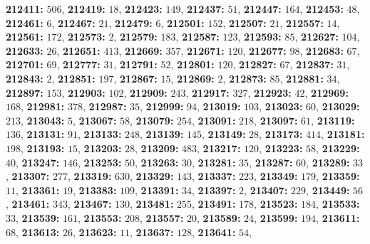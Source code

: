 \textsf{\bfseries 212411:} $506$, \textsf{\bfseries 212419:} $18$, \textsf{\bfseries 212423:} $149$, \textsf{\bfseries 212437:} $51$, \textsf{\bfseries 212447:} $164$, \textsf{\bfseries 212453:} $48$, \textsf{\bfseries 212461:} $6$, \textsf{\bfseries 212467:} $21$, \textsf{\bfseries 212479:} $6$, \textsf{\bfseries 212501:} $152$, \textsf{\bfseries 212507:} $21$, \textsf{\bfseries 212557:} $14$, \textsf{\bfseries 212561:} $172$, \textsf{\bfseries 212573:} $2$, \textsf{\bfseries 212579:} $183$, \textsf{\bfseries 212587:} $123$, \textsf{\bfseries 212593:} $85$, \textsf{\bfseries 212627:} $104$, \textsf{\bfseries 212633:} $26$, \textsf{\bfseries 212651:} $413$, \textsf{\bfseries 212669:} $357$, \textsf{\bfseries 212671:} $120$, \textsf{\bfseries 212677:} $98$, \textsf{\bfseries 212683:} $67$, \textsf{\bfseries 212701:} $69$, \textsf{\bfseries 212777:} $31$, \textsf{\bfseries 212791:} $52$, \textsf{\bfseries 212801:} $120$, \textsf{\bfseries 212827:} $67$, \textsf{\bfseries 212837:} $31$, \textsf{\bfseries 212843:} $2$, \textsf{\bfseries 212851:} $197$, \textsf{\bfseries 212867:} $15$, \textsf{\bfseries 212869:} $2$, \textsf{\bfseries 212873:} $85$, \textsf{\bfseries 212881:} $34$, \textsf{\bfseries 212897:} $153$, \textsf{\bfseries 212903:} $102$, \textsf{\bfseries 212909:} $243$, \textsf{\bfseries 212917:} $327$, \textsf{\bfseries 212923:} $42$, \textsf{\bfseries 212969:} $168$, \textsf{\bfseries 212981:} $378$, \textsf{\bfseries 212987:} $35$, \textsf{\bfseries 212999:} $94$, \textsf{\bfseries 213019:} $103$, \textsf{\bfseries 213023:} $60$, \textsf{\bfseries 213029:} $213$, \textsf{\bfseries 213043:} $5$, \textsf{\bfseries 213067:} $58$, \textsf{\bfseries 213079:} $254$, \textsf{\bfseries 213091:} $218$, \textsf{\bfseries 213097:} $61$, \textsf{\bfseries 213119:} $136$, \textsf{\bfseries 213131:} $91$, \textsf{\bfseries 213133:} $248$, \textsf{\bfseries 213139:} $145$, \textsf{\bfseries 213149:} $28$, \textsf{\bfseries 213173:} $414$, \textsf{\bfseries 213181:} $198$, \textsf{\bfseries 213193:} $15$, \textsf{\bfseries 213203:} $28$, \textsf{\bfseries 213209:} $483$, \textsf{\bfseries 213217:} $120$, \textsf{\bfseries 213223:} $58$, \textsf{\bfseries 213229:} $40$, \textsf{\bfseries 213247:} $146$, \textsf{\bfseries 213253:} $50$, \textsf{\bfseries 213263:} $30$, \textsf{\bfseries 213281:} $35$, \textsf{\bfseries 213287:} $60$, \textsf{\bfseries 213289:} $33$, \textsf{\bfseries 213307:} $277$, \textsf{\bfseries 213319:} $630$, \textsf{\bfseries 213329:} $143$, \textsf{\bfseries 213337:} $223$, \textsf{\bfseries 213349:} $179$, \textsf{\bfseries 213359:} $11$, \textsf{\bfseries 213361:} $19$, \textsf{\bfseries 213383:} $109$, \textsf{\bfseries 213391:} $34$, \textsf{\bfseries 213397:} $2$, \textsf{\bfseries 213407:} $229$, \textsf{\bfseries 213449:} $56$, \textsf{\bfseries 213461:} $343$, \textsf{\bfseries 213467:} $130$, \textsf{\bfseries 213481:} $255$, \textsf{\bfseries 213491:} $178$, \textsf{\bfseries 213523:} $184$, \textsf{\bfseries 213533:} $33$, \textsf{\bfseries 213539:} $161$, \textsf{\bfseries 213553:} $208$, \textsf{\bfseries 213557:} $20$, \textsf{\bfseries 213589:} $24$, \textsf{\bfseries 213599:} $194$, \textsf{\bfseries 213611:} $68$, \textsf{\bfseries 213613:} $26$, \textsf{\bfseries 213623:} $11$, \textsf{\bfseries 213637:} $128$, \textsf{\bfseries 213641:} $54$, 

